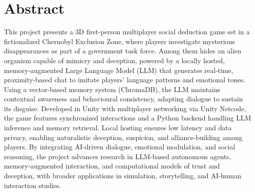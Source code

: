 \chapter*{Abstract}
		\vspace{1.5cm}

This project presents a 3D first-person multiplayer social deduction game set in a fictionalized Chernobyl Exclusion Zone, where players investigate mysterious disappearances as part of a government task force. Among them hides an alien organism capable of mimicry and deception, powered by a locally hosted, memory-augmented Large Language Model (LLM) that generates real-time, proximity-based chat to imitate players’ language patterns and emotional tones. Using a vector-based memory system (ChromaDB), the LLM maintains contextual awareness and behavioural consistency, adapting dialogue to sustain its disguise. Developed in Unity with multiplayer networking via Unity Netcode, the game features synchronized interactions and a Python backend handling LLM inference and memory retrieval. Local hosting ensures low latency and data privacy, enabling naturalistic deception, suspicion, and alliance-building among players. By integrating AI-driven dialogue, emotional modulation, and social reasoning, the project advances research in LLM-based autonomous agents, memory-augmented interaction, and computational models of trust and deception, with broader applications in simulation, storytelling, and AI-human interaction studies.
